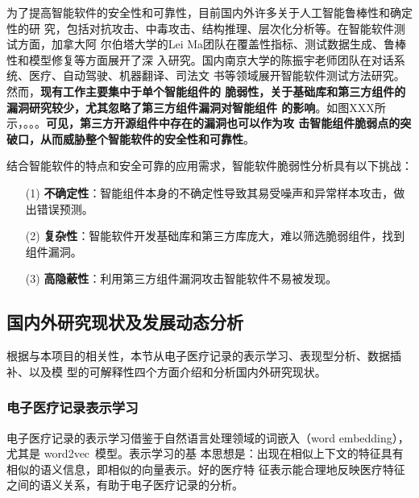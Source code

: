 为了提高智能软件的安全性和可靠性，目前国内外许多关于人工智能鲁棒性和确定性的研
究，包括对抗攻击、中毒攻击、结构推理、层次化分析等。在智能软件测试方面，加拿大阿
尔伯塔大学的Lei Ma团队在覆盖性指标、测试数据生成、鲁棒性和模型修复等方面展开了深
入研究。国内南京大学的陈振宇老师团队在对话系统、医疗、自动驾驶、机器翻译、司法文
书等领域展开智能软件测试方法研究。然而，\textbf{现有工作主要集中于单个智能组件的
脆弱性，关于基础库和第三方组件的漏洞研究较少，尤其忽略了第三方组件漏洞对智能组件
的影响}。如图XXX所示，。。。\textbf{可见，第三方开源组件中存在的漏洞也可以作为攻
击智能组件脆弱点的突破口，从而威胁整个智能软件的安全性和可靠性}。

结合智能软件的特点和安全可靠的应用需求，智能软件脆弱性分析具有以下挑战：

\begin{itemize}
    \item[(1)]\textbf{不确定性}：智能组件本身的不确定性导致其易受噪声和异常样本攻击，做出错误预测。
    \item[(2)]\textbf{复杂性}：智能软件开发基础库和第三方库庞大，难以筛选脆弱组件，找到组件漏洞。
    \item[(3)]\textbf{高隐蔽性}：利用第三方组件漏洞攻击智能软件不易被发现。
\end{itemize}








\subsection{国内外研究现状及发展动态分析}\label{relatedwork}

根据与本项目的相关性，本节从电子医疗记录的表示学习、表现型分析、数据插补、以及模
型的可解释性四个方面介绍和分析国内外研究现状。

\subsubsection{电子医疗记录表示学习}

电子医疗记录的表示学习借鉴于自然语言处理领域的词嵌入（word embedding），尤其是
word2vec~模型。表示学习的基
本思想是：出现在相似上下文的特征具有相似的语义信息，即相似的向量表示。好的医疗特
征表示能合理地反映医疗特征之间的语义关系，有助于电子医疗记录的分析。

